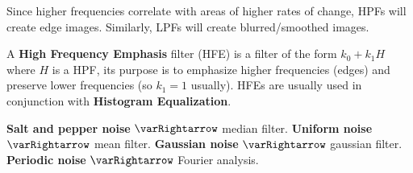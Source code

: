 \documentclass[10pt, twocolumn]{article}
\let\bold=\textbf
\begin{document}
Since higher frequencies correlate with areas of higher rates of change, HPFs will create edge images.
Similarly, LPFs will create blurred/smoothed images.

A \bold{High Frequency Emphasis} filter (HFE) is a filter of the form ${k_0+k_1H}$ where $H$ is a HPF, its purpose is to emphasize higher frequencies (edges) and preserve lower frequencies
(so $k_1=1$ usually).
HFEs are usually used in conjunction with \bold{Histogram Equalization}.

\bold{Salt and pepper noise} $\varRightarrow$ median filter.
\bold{Uniform noise} $\varRightarrow$ mean filter.
\bold{Gaussian noise} $\varRightarrow$ gaussian filter.
\bold{Periodic noise} $\varRightarrow$ Fourier analysis.
\end{document}
